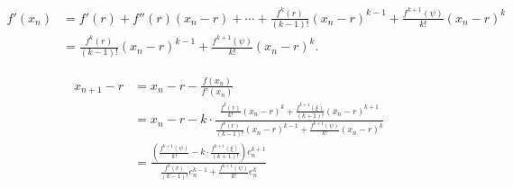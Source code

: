 \documentclass[lang=cn,bibend=bibtex]{elegantpaper}
\theoremstyle{boldexercise}
\begin{document}
\begin{align}
  f'(x_n)&=f'(r)+f''(r)(x_n-r)+\cdots+\frac{f^k(r)}{(k-1)!}(x_n-r)^{k-1}+\frac{f^{k+1}(\psi)}{k!}(x_n-r)^k\\
         &=\frac{f^k(r)}{(k-1)!}(x_n-r)^{k-1}+\frac{f^{k+1}(\psi)}{k!}(x_n-r)^k.
\end{align}

\begin{align}
  x_{n+1}-r&=x_n-r-\frac{f(x_n)}{f'(x_n)}\\
           &=x_n-r-k\cdot\frac{\frac{f^k(r)}{k!}(x_n-r)^k+\frac{f^{k+1}(\xi)}{(k+1)!}(x_n-r)^{k+1}}{\frac{f^k(r)}{(k-1)!}(x_n-r)^{k-1}+\frac{f^{k+1}(\psi)}{k!}(x_n-r)^k}\\
           &=\frac{(\frac{f^{k+1}(\psi)}{k!}-k\cdot\frac{f^{k+1}(\xi)}{(k+1)!})e_n^{k+1}}{\frac{f^k(r)}{(k-1)!}e_{n}^{k-1}+\frac{f^{k+1}(\psi)}{k!}e_{n}^k}
\end{align}
\end{document}
